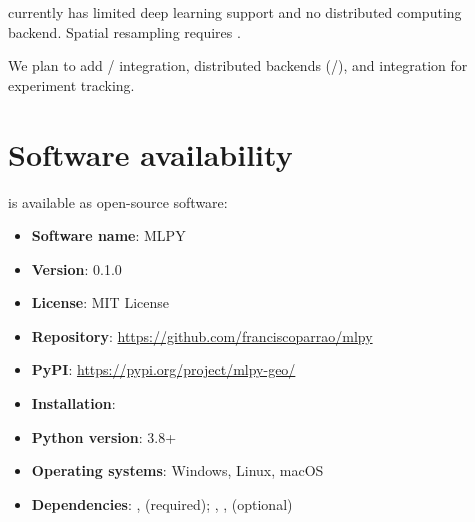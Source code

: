 \documentclass[article]{jss}
\begin{document}
 currently has limited deep learning support and no distributed computing backend. Spatial resampling requires .

We plan to add / integration, distributed backends (/), and  integration for experiment tracking.

\section{Software availability} \label{sec:software}

 is available as open-source software:

\begin{itemize}
\item \textbf{Software name}: MLPY
\item \textbf{Version}: 0.1.0
\item \textbf{License}: MIT License
\item \textbf{Repository}: \url{https://github.com/franciscoparrao/mlpy}
\item \textbf{PyPI}: \url{https://pypi.org/project/mlpy-geo/}
\item \textbf{Installation}: 
\item \textbf{Python version}: 3.8+
\item \textbf{Operating systems}: Windows, Linux, macOS
\item \textbf{Dependencies}: ,  (required); , ,  (optional)
\end{itemize}




\end{document}

